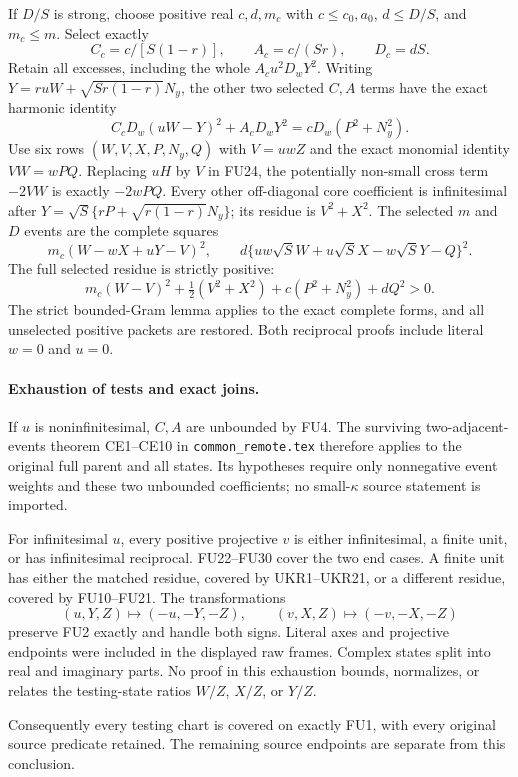 If $D/S$ is strong, choose positive real $c,d,m_c$ with
$c\le c_0,a_0$, $d\le D/S$, and $m_c\le m$. Select exactly
\[
 C_c=c/[S(1-r)],\qquad A_c=c/(Sr),\qquad D_c=dS.
 \tag{FU27}
\]
Retain all excesses, including the whole $A_cu^2D_wY^2$.
Writing $Y=ruW+\sqrt{Sr(1-r)}N_y$, the other two selected
$C,A$ terms have the exact harmonic identity
\[
 C_cD_w(uW-Y)^2+A_cD_wY^2=cD_w(P^2+N_y^2).
 \tag{FU28}
\]
Use six rows $(W,V,X,P,N_y,Q)$ with $V=uwZ$ and the exact
monomial identity $VW=wPQ$. Replacing $uH$ by $V$ in FU24,
the potentially non-small cross term $-2VW$ is exactly $-2wPQ$.
Every other off-diagonal core coefficient is infinitesimal after
$Y=\sqrt S\{rP+\sqrt{r(1-r)}N_y\}$; its residue is $V^2+X^2$.
The selected $m$ and $D$ events are the complete squares
\[
 m_c(W-wX+uY-V)^2,\qquad
 d\{uw\sqrt S W+u\sqrt S X-w\sqrt S Y-Q\}^2.
 \tag{FU29}
\]
The full selected residue is strictly positive:
\[
 m_c(W-V)^2+\tfrac12(V^2+X^2)+c(P^2+N_y^2)+dQ^2>0.
 \tag{FU30}
\]
The strict bounded-Gram lemma applies to the exact complete
forms, and all unselected positive packets are restored. Both
reciprocal proofs include literal $w=0$ and $u=0$.

\paragraph{Exhaustion of tests and exact joins.}
If $u$ is noninfinitesimal, $C,A$ are unbounded by FU4. The
surviving two-adjacent-events theorem CE1--CE10 in
\texttt{common\_remote.tex}
therefore applies to the original full parent and all states.
Its hypotheses require only nonnegative event weights and these
two unbounded coefficients; no small-$\kappa$ source statement
is imported.

For infinitesimal $u$, every positive projective $v$ is either
infinitesimal, a finite unit, or has infinitesimal reciprocal.
FU22--FU30 cover the two end cases. A finite unit has either the
matched residue, covered by UKR1--UKR21, or a different residue,
covered by FU10--FU21. The transformations
\[
 (u,Y,Z)\mapsto(-u,-Y,-Z),\qquad
 (v,X,Z)\mapsto(-v,-X,-Z)
 \tag{FU31}
\]
preserve FU2 exactly and handle both signs. Literal axes and
projective endpoints were included in the displayed raw frames.
Complex states split into real and imaginary parts. No proof in
this exhaustion bounds, normalizes, or relates the testing-state
ratios $W/Z$, $X/Z$, or $Y/Z$.

Consequently every testing chart is covered on exactly FU1,
with every original source predicate retained. The remaining
source endpoints are separate from this conclusion.
